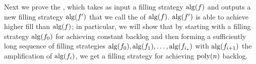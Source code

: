 

Next we prove the , which takes as
input a filling strategy $\alg(f)$ and outputs a new filling
strategy $\alg(f')$ that we call the  of
$\alg(f)$. $\alg(f')$ is able to achieve higher fill than
$\alg(f)$; in particular, we will show that by starting with a
filling strategy $\alg(f_0)$ for achieving constant backlog and
then forming a sufficiently long sequence of filling strategies
$\alg(f_0), \alg(f_1), \ldots, \alg(f_{i_*})$ with
$\alg(f_{i+1})$ the amplification of $\alg(f_i)$, we 
get a filling strategy for achieving $\poly(n)$ backlog.

